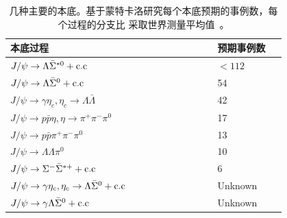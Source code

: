 \begin{table}[htbp]
    \caption{%
        几种主要的本底。基于蒙特卡洛研究每个本底预期的事例数，每个过程的分支比
        采取世界测量平均值~\cite{PDG}。
    }%
    \label{tab:background}
    \begin{center}
        \begin{tabular} {p{0.6 \linewidth} p{0.2\linewidth}}
            \toprule 
            本底过程  &  预期事例数 \\
            \midrule 
            $J/\psi \to \Lambda \bar{\Sigma}^{*0} +{\rm c.c}$ & $<112$ \\
            $J/\psi \to \Lambda \bar{\Sigma}^{0} + {\rm c.c}$ & 54\\
            $J/\psi \to \gamma \eta_c, \eta_c \to \Lambda \bar{\Lambda}
            $ & 42\\
            $J/\psi \to p \bar{p} \eta, \eta \to \pi^{+} \pi^{-}
            \pi^{0}$ & 17\\

            $J/\psi \to p \bar{p} \pi^{+} \pi^{-} \pi^{0}$ & 13 \\
            $J/\psi \to \Lambda \Lambda \pi^{0}$ & 10 \\
            $J/\psi \to \Sigma^{-} \bar{\Sigma}^{*+} + {\rm c.c}$ & 6 \\

            $J/\psi \to \gamma \eta_c, \eta_c \to \Lambda
            \bar{\Sigma}^{0} + {\rm c.c}$ &  Unknown \\

            $J/\psi \to \gamma  \Lambda
            \bar{\Sigma}^{0} + {\rm c.c}$ &  Unknown \\

            \bottomrule
        \end{tabular}
    \end{center}
\end{table}

